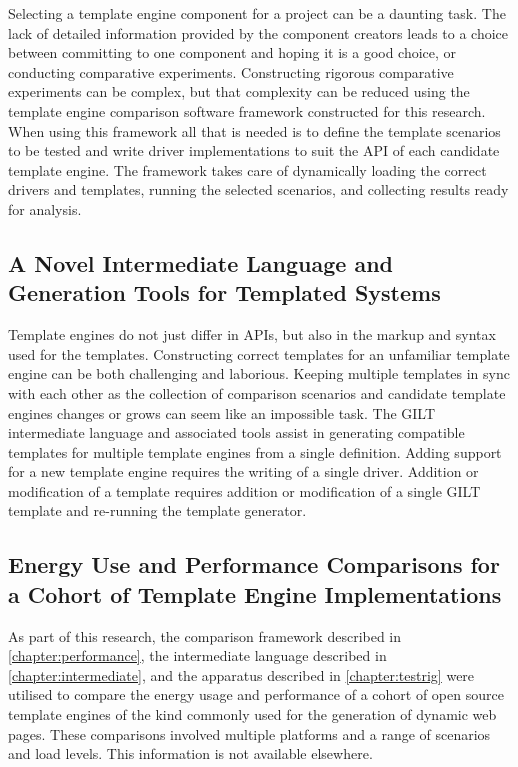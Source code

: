 Selecting a template engine component for a project can be a daunting task. The lack of detailed information provided by the component creators leads to a choice between committing to one component and hoping it is a good choice, or conducting comparative experiments. Constructing rigorous comparative experiments can be complex, but that complexity can be reduced using the template engine comparison software framework constructed for this research. When using this framework all that is needed is to define the template scenarios to be tested and write driver implementations to suit the API of each candidate template engine. The framework takes care of dynamically loading the correct drivers and templates, running the selected scenarios, and collecting results ready for analysis.

\subsection{A Novel Intermediate Language and Generation Tools for Templated Systems}
\label{contrib:gilt}

Template engines do not just differ in APIs, but also in the markup and syntax used for the templates. Constructing correct templates for an unfamiliar template engine can be both challenging and laborious. Keeping multiple templates in sync with each other as the collection of comparison scenarios and candidate template engines changes or grows can seem like an impossible task. The GILT intermediate language and associated tools assist in generating compatible templates for multiple template engines from a single definition. Adding support for a new template engine requires the writing of a single driver. Addition or modification of a template requires addition or modification of a single GILT template and re-running the template generator.

\subsection{Energy Use and Performance Comparisons for a Cohort of Template Engine Implementations}
\label{contrib:engines}

As part of this research, the comparison framework described in \autoref{chapter:performance}, the intermediate language described in \autoref{chapter:intermediate}, and the apparatus described in \autoref{chapter:testrig} were utilised to compare the energy usage and performance of a cohort of open source template engines of the kind commonly used for the generation of dynamic web pages. These comparisons involved multiple platforms and a range of scenarios and load levels. This information is not available elsewhere.

